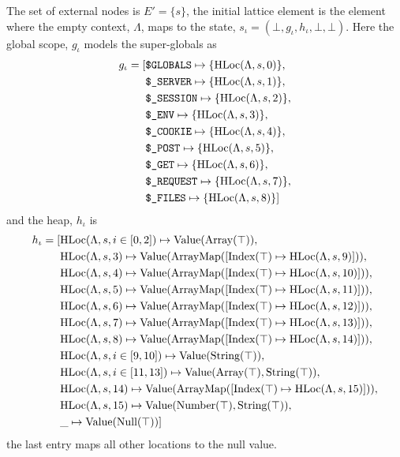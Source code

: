 The set of external nodes is $E' = \{s\}$, the initial lattice element is the element where the empty context, $\Lambda$, maps to the state, $s_\iota = (\bot, g_\iota, h_\iota, \bot, \bot)$. Here the global scope, $g_\iota$ models the super-globals as
\begin{align*}
g_\iota = 	[&\texttt{\$GLOBALS}\mapsto \{\text{HLoc}(\Lambda, s, 0)\},\notag\\
			 &\texttt{\$\_SERVER}\mapsto \{\text{HLoc}(\Lambda, s, 1)\},\notag\\
			 &\texttt{\$\_SESSION}\mapsto \{\text{HLoc}(\Lambda, s, 2)\},\notag\\
			 &\texttt{\$\_ENV}\mapsto \{\text{HLoc}(\Lambda, s, 3)\},\notag\\
			 &\texttt{\$\_COOKIE}\mapsto \{\text{HLoc}(\Lambda, s, 4)\},\notag\\
			 &\texttt{\$\_POST}\mapsto \{\text{HLoc}(\Lambda, s, 5)\},\notag\\
			 &\texttt{\$\_GET}\mapsto \{\text{HLoc}(\Lambda, s, 6)\},\notag\\
			 &\texttt{\$\_REQUEST}\mapsto \{\text{HLoc}(\Lambda, s, 7)\}, \notag\\
			 &\texttt{\$\_FILES}\mapsto \{\text{HLoc}(\Lambda, s, 8)\}]
\end{align*} 
and the heap, $h_\iota$ is
\begin{align*}
h_\iota = [	&\text{HLoc}(\Lambda, s, i\in[0,2])\mapsto \text{Value}(\text{Array}(\top)),\notag\\
			&\text{HLoc}(\Lambda, s, 3)\mapsto \text{Value}(\text{ArrayMap}([\text{Index}(\top)\mapsto\text{HLoc}(\Lambda, s, 9)])),\notag\\
			&\text{HLoc}(\Lambda, s, 4)\mapsto \text{Value}(\text{ArrayMap}([\text{Index}(\top)\mapsto\text{HLoc}(\Lambda, s, 10)])),\notag\\
			&\text{HLoc}(\Lambda, s, 5)\mapsto \text{Value}(\text{ArrayMap}([\text{Index}(\top)\mapsto\text{HLoc}(\Lambda, s, 11)])),\notag\\			
			&\text{HLoc}(\Lambda, s, 6)\mapsto \text{Value}(\text{ArrayMap}([\text{Index}(\top)\mapsto\text{HLoc}(\Lambda, s, 12)])),\notag\\			
			&\text{HLoc}(\Lambda, s, 7)\mapsto \text{Value}(\text{ArrayMap}([\text{Index}(\top)\mapsto\text{HLoc}(\Lambda, s, 13)])),\notag\\			
			&\text{HLoc}(\Lambda, s, 8)\mapsto \text{Value}(\text{ArrayMap}([\text{Index}(\top)\mapsto\text{HLoc}(\Lambda, s, 14)])),\notag\\			
			&\text{HLoc}(\Lambda, s, i \in [9, 10])\mapsto \text{Value}(\text{String}(\top)),\notag\\
			&\text{HLoc}(\Lambda, s, i\in[11,13])\mapsto \text{Value}(\text{Array}(\top),\text{String}(\top)),\notag\\
			&\text{HLoc}(\Lambda, s, 14)\mapsto \text{Value}(\text{ArrayMap}([\text{Index}(\top)\mapsto\text{HLoc}(\Lambda, s, 15)])),\notag\\			
			&\text{HLoc}(\Lambda, s, 15)\mapsto \text{Value}(\text{Number}(\top),\text{String}(\top)),\notag\\
			&\_ \mapsto \text{Value}(\text{Null}(\top))]
\end{align*}
the last entry maps all other locations to the null value. 

